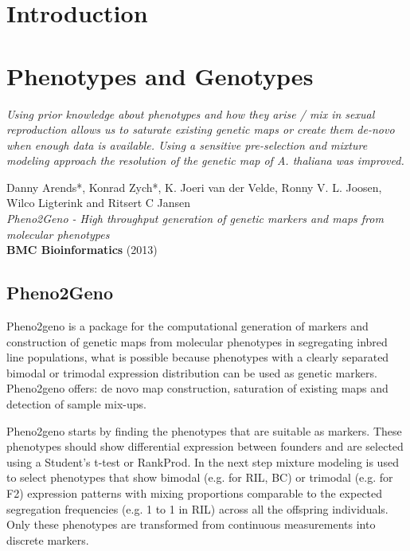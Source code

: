 \documentclass[8pt, twoside, a5paper]{report}
\newenvironment{myexampleblock}[1]{%
    \tcolorbox[beamer,%
    noparskip,breakable,
    colback=LightGreen,colframe=DarkGreen,%
    colbacklower=LimeGreen!75!LightGreen,%
    title=#1]}%
    {\endtcolorbox}
\newcommand{\authors}[1]{\small{#1}}
\newcommand{\bold}[1]{{\bfseries #1}}
\begin{document}
\chapter{Introduction}
\lipsum[1-3]

\chapter{Phenotypes and Genotypes}

\emph{Using prior knowledge about phenotypes and how they arise / mix in sexual reproduction allows us to saturate 
existing genetic maps or create them de-novo when enough data is available. Using a sensitive pre-selection 
and mixture modeling approach the resolution of the genetic map of A. thaliana was improved.}

\null
\vfill

\begin{myexampleblock}{Under review:}
  \authors{Danny Arends*, Konrad Zych*, K. Joeri van der Velde, Ronny V. L. Joosen, Wilco Ligterink and Ritsert C Jansen}\\
  \emph{Pheno2Geno - High throughput generation of genetic markers and maps from molecular phenotypes}\\
  \bold{BMC Bioinformatics} (2013)
\end{myexampleblock}
\newpage

\section{Pheno2Geno}
Pheno2geno is a package for the computational generation of markers and construction of genetic maps from 
molecular phenotypes in segregating inbred line populations, what is possible because phenotypes with a 
clearly separated bimodal or trimodal expression distribution can be used as genetic markers. Pheno2geno 
offers: de novo map construction, saturation of existing maps and detection of sample mix-ups. 

Pheno2geno starts by finding the phenotypes that are suitable as markers. These phenotypes should show 
differential expression between founders and are selected using a Student's t-test or RankProd. In the 
next step mixture modeling is used to select phenotypes that show bimodal (e.g. for RIL, BC) or trimodal 
(e.g. for F2) expression patterns with mixing proportions comparable to the expected segregation 
frequencies (e.g. 1 to 1 in RIL) across all the offspring individuals. Only these phenotypes are 
transformed from continuous measurements into discrete markers.
\end{document}
